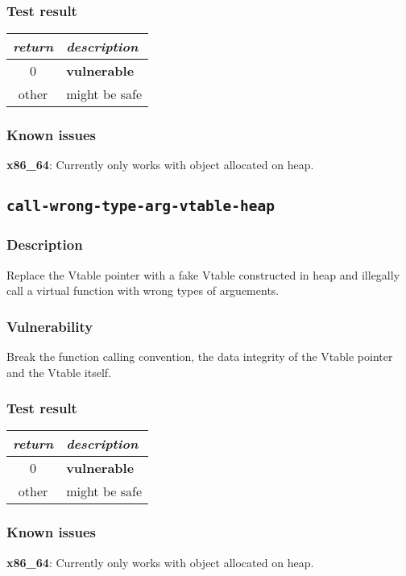 \documentclass[a4paper]{book}
\begin{document}
\subsubsection{Test result}
\begin{tabular}{cl}
  \toprule
  \emph{return}  & \emph{description} \\
  \midrule
  0              & \textbf{vulnerable} \\
  other          & might be safe \\
  \bottomrule
\end{tabular}

\subsubsection{Known issues}

\textbf{x86\_64}: Currently only works with object allocated on heap.


\newpage
\subsection{\texttt{call-wrong-type-arg-vtable-heap}}\label{test-call-wrong-type-arg-vtable-heap}

\subsubsection{Description}
Replace the Vtable pointer with a fake Vtable constructed in heap and
illegally call a virtual function with wrong types of arguements.

\subsubsection{Vulnerability}
Break the function calling convention, the data integrity of the Vtable pointer and the Vtable itself.

\subsubsection{Test result}
\begin{tabular}{cl}
  \toprule
  \emph{return}  & \emph{description} \\
  \midrule
  0              & \textbf{vulnerable} \\
  other          & might be safe \\
  \bottomrule
\end{tabular}

\subsubsection{Known issues}
\textbf{x86\_64}: Currently only works with object allocated on heap.
\end{document}
